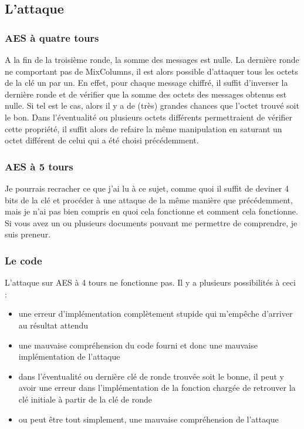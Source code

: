\documentclass[a4paper,11pt]{article}
\begin{document}
\subsection*{L'attaque}

\subsubsection*{AES à quatre tours}

A la fin de la troisième ronde, la somme des messages est nulle. La dernière ronde ne comportant pas
de MixColumns, il est alors possible d'attaquer tous les octets de la clé un par un. En effet,
pour chaque message chiffré, il suffit d'inverser la dernière ronde et de vérifier que la somme des
octets des messages obtenus est nulle. Si tel est le cas, alors il y a de (très) grandes chances que
l'octet trouvé soit le bon. Dans l'éventualité ou plusieurs octets différents permettraient de
vérifier cette propriété, il suffit alors de refaire la même manipulation en saturant un octet
différent de celui qui a été choisi précédemment.

\subsubsection*{AES à 5 tours}

Je pourrais recracher ce que j'ai lu à ce sujet, comme quoi il suffit de deviner 4 bits de la clé et
procéder à une attaque de la même manière que précédemment, mais je n'ai pas bien compris en quoi
cela fonctionne et comment cela fonctionne. Si vous avez un ou plusieurs documents pouvant me
permettre de comprendre, je suis preneur.

\subsubsection*{Le code}

L'attaque sur AES à 4 tours ne fonctionne pas. Il y a plusieurs possibilités à ceci :
\begin{itemize}
    \item une erreur d'implémentation complètement stupide qui m'empêche d'arriver au résultat
        attendu
    \item une mauvaise compréhension du code fourni et donc une mauvaise implémentation de l'attaque
    \item dans l'éventualité ou dernière clé de ronde trouvée soit le bonne, il peut y avoir une
        erreur dans l'implémentation de la fonction chargée de retrouver la clé initiale à partir de
        la clé de ronde
    \item ou peut être tout simplement, une mauvaise compréhension de l'attaque
\end{itemize}
\end{document}
